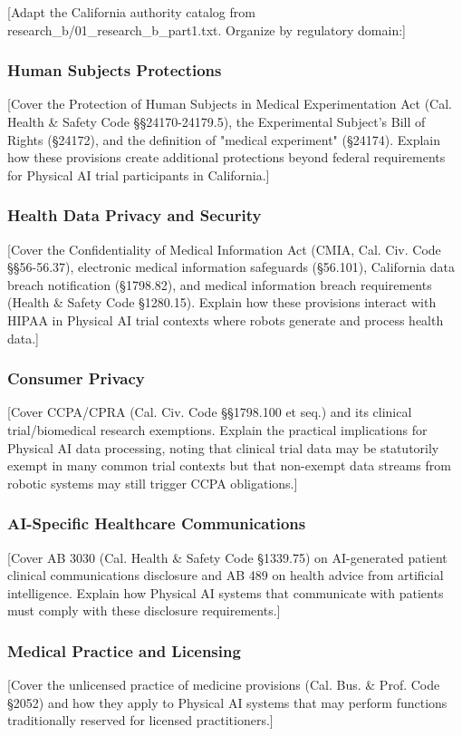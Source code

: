 [Adapt the California authority catalog from research\_b/01\_research\_b\_part1.txt.
Organize by regulatory domain:]

\subsubsection{Human Subjects Protections}
[Cover the Protection of Human Subjects in Medical Experimentation Act
(Cal. Health \& Safety Code \S\S 24170-24179.5), the Experimental Subject's
Bill of Rights (\S 24172), and the definition of "medical experiment"
(\S 24174). Explain how these provisions create additional protections beyond
federal requirements for Physical AI trial participants in California.]

\subsubsection{Health Data Privacy and Security}
[Cover the Confidentiality of Medical Information Act (CMIA, Cal. Civ. Code
\S\S 56-56.37), electronic medical information safeguards (\S 56.101),
California data breach notification (\S 1798.82), and medical information
breach requirements (Health \& Safety Code \S 1280.15). Explain how these
provisions interact with HIPAA \cite{hipaa} in Physical AI trial contexts
where robots generate and process health data.]

\subsubsection{Consumer Privacy}
[Cover CCPA/CPRA (Cal. Civ. Code \S\S 1798.100 et seq.) and its clinical
trial/biomedical research exemptions. Explain the practical implications for
Physical AI data processing, noting that clinical trial data may be statutorily
exempt in many common trial contexts but that non-exempt data streams from
robotic systems may still trigger CCPA obligations.]

\subsubsection{AI-Specific Healthcare Communications}
[Cover AB 3030 (Cal. Health \& Safety Code \S 1339.75) on AI-generated patient
clinical communications disclosure and AB 489 on health advice from artificial
intelligence. Explain how Physical AI systems that communicate with patients
must comply with these disclosure requirements.]

\subsubsection{Medical Practice and Licensing}
[Cover the unlicensed practice of medicine provisions (Cal. Bus. \& Prof. Code
\S 2052) and how they apply to Physical AI systems that may perform functions
traditionally reserved for licensed practitioners.]


